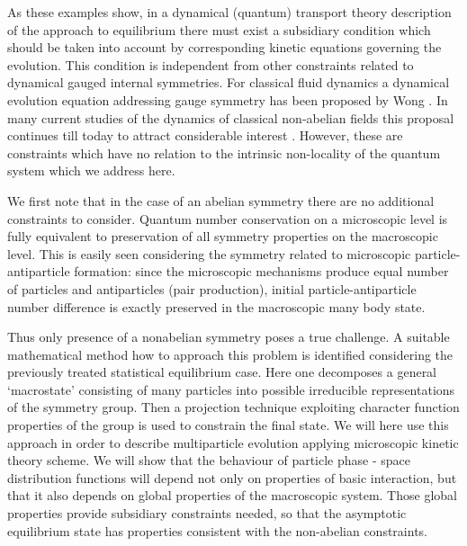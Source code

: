 \documentclass[a4paper,11pt]{article}
\begin{document}
As these examples show, in a dynamical (quantum) transport theory
description of the approach to equilibrium there must exist a
subsidiary condition which should be taken into account by
corresponding kinetic equations governing the evolution. This
condition is independent from other constraints related to
dynamical gauged internal symmetries. For classical fluid dynamics
a dynamical evolution equation addressing gauge symmetry has been
proposed by Wong \cite{Won70}. In many current studies of the
dynamics of classical non-abelian fields this proposal continues
till today to attract considerable interest \cite{LM99}. However,
these are constraints which have no relation to the intrinsic
non-locality of the quantum system which we address here.

We first note that in the case of an abelian symmetry there are no
additional constraints to consider. Quantum number conservation on
a microscopic level is fully equivalent to preservation of all
symmetry properties on the macroscopic level. This is easily seen
considering the \coordHE{} symmetry related to microscopic
particle-antiparticle formation: since the microscopic mechanisms
produce equal number of particles and antiparticles (pair
production), initial particle-antiparticle number difference is
exactly preserved in the  macroscopic many body state.

Thus only presence of a nonabelian symmetry poses a true
challenge. A suitable mathematical method how to approach this
problem is identified considering  the previously treated
statistical equilibrium case.  Here one decomposes a general
`macrostate' consisting of many particles into possible
irreducible representations of the symmetry group. Then a
projection technique exploiting character function properties of
the group is used to constrain the final state. We will here use
this approach in order to describe multiparticle evolution
applying microscopic kinetic theory scheme. We will show that the
behaviour of particle phase - space distribution functions will
depend not only on properties of basic interaction, but that it
also depends on global properties of the macroscopic system. Those
global properties provide subsidiary constraints needed, so that
the asymptotic equilibrium state has properties  consistent with
the non-abelian constraints.
\end{document}
